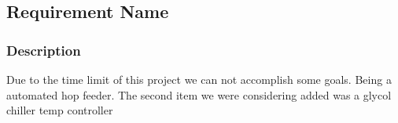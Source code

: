 
\subsection{Requirement Name}
\subsubsection{Description}
Due to the time limit of this project we can not accomplish some goals. Being a automated hop feeder. The second item we were considering added was a glycol chiller temp controller 